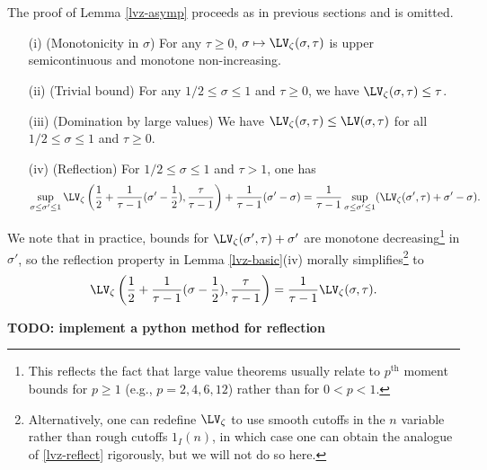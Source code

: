The proof of Lemma \ref{lvz-asymp} proceeds as in previous sections and is omitted.

\begin{lemma}\label{lvz-basic}  
    \begin{itemize}
        \item[(i)] (Monotonicity in $\sigma$) For any $\tau \geq 0$, $\sigma \mapsto \LV_\zeta(\sigma,\tau)$ is upper semicontinuous and monotone non-increasing.
        \item[(ii)] (Trivial bound) For any $1/2 \leq \sigma \leq 1$ and $\tau \geq 0$, we have $\LV_\zeta(\sigma,\tau) \leq \tau$.
        \item[(iii)] (Domination by large values)  We have $\LV_\zeta(\sigma,\tau) \leq \LV(\sigma,\tau)$ for all $1/2 \leq \sigma \leq 1$ and $\tau \geq 0$.
        \item[(iv)] (Reflection) For $1/2 \leq \sigma \leq 1$ and $\tau > 1$, one has
        $$ \sup_{\sigma \leq \sigma' \leq 1} \LV_\zeta\left(\frac{1}{2} + \frac{1}{\tau-1} (\sigma'-\frac{1}{2}), \frac{\tau}{\tau-1}\right) + \frac{1}{\tau-1} (\sigma'-\sigma) = \frac{1}{\tau-1} \sup_{\sigma \leq \sigma' \leq 1} (\LV_\zeta(\sigma',\tau) + \sigma'-\sigma).$$ 
    \end{itemize}
\end{lemma}


We note that in practice, bounds for $\LV_\zeta(\sigma',\tau)+\sigma'$ are monotone decreasing\footnote{This reflects the fact that large value theorems usually relate to $p^{\mathrm{th}}$ moment bounds for $p \geq 1$ (e.g., $p = 2, 4, 6, 12$) rather than for $0 < p < 1$.} in $\sigma'$, so the reflection property in Lemma \ref{lvz-basic}(iv) morally simplifies\footnote{Alternatively, one can redefine $\LV_\zeta$ to use smooth cutoffs in the $n$ variable rather than rough cutoffs $1_I(n)$, in which case one can obtain the analogue of \eqref{lvz-reflect} rigorously, but we will not do so here.} to
\begin{equation}\label{lvz-reflect}
     \LV_\zeta\left(\frac{1}{2} + \frac{1}{\tau-1} (\sigma-\frac{1}{2}), \frac{\tau}{\tau-1}\right) = \frac{1}{\tau-1} \LV_\zeta(\sigma,\tau).
\end{equation} 

{\bf TODO: implement a python method for reflection}

